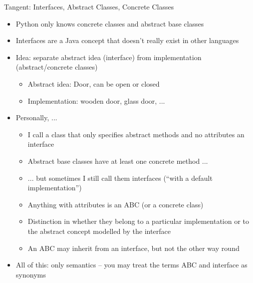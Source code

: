 \begin{frame}{Tangent: Interfaces, Abstract Classes, Concrete Classes}
%
\begin{itemize}
\item Python only knows concrete classes and abstract base classes
\item Interfaces are a Java concept that doesn't really exist in other languages
\item Idea: separate abstract idea (\thus interface) from implementation (abstract/concrete classes)
	\begin{itemize}
	\item Abstract idea: Door, can be open or closed
	\item Implementation: wooden door, glass door, ...
	\end{itemize}
\item Personally, ...
	\begin{itemize}
	\item I call a class that only specifies abstract methods and no attributes an interface
	\item Abstract base classes have at least one concrete method ...
	\item ... but sometimes I still call them interfaces (\enquote{with a default implementation})
	\item Anything with attributes is an ABC (or a concrete class)
	\item Distinction in whether they belong to a particular implementation or to the abstract concept modelled by the interface
	\item[\Thus] An ABC may inherit from an interface, but not the other way round
	\end{itemize}
\item All of this: only semantics -- you may treat the terms ABC and interface as synonyms
\end{itemize}
%
\end{frame}


